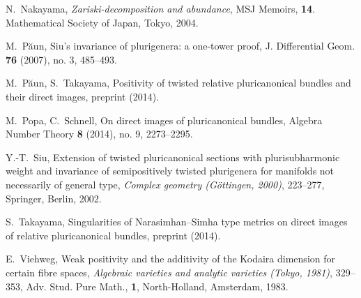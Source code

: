 \documentclass[12pt,twoside]{amsart}
\theoremstyle{definition}
\begin{document}
\begin{thebibliography}{BCHM}
N.~Nakayama, {\em{Zariski-decomposition and abundance}}, 
MSJ Memoirs, {\textbf{14}}. Mathematical Society of Japan, Tokyo, 2004. 

M.~P\u aun, 
Siu's invariance of plurigenera: a one-tower proof, 
J. Differential Geom. {\textbf{76}} (2007), no. 3, 485--493.

M.~P\u aun, S.~Takayama, 
Positivity of twisted relative 
pluricanonical bundles and their direct images, preprint (2014).  

M.~Popa, C.~Schnell, 
On direct images of pluricanonical bundles, 
Algebra Number Theory {\textbf{8}} (2014), no. 9, 2273--2295. 

Y.-T.~Siu, 
Extension of twisted pluricanonical 
sections with plurisubharmonic weight and 
invariance 
of semipositively twisted plurigenera for manifolds 
not necessarily of general type, 
{\em{Complex geometry (G\"ottingen, 2000)}}, 
223--277, Springer, Berlin, 2002. 

S.~Takayama, Singularities of Narasimhan--Simha type metrics on direct images 
of relative pluricanonical bundles, preprint (2014). 

E.~Viehweg, 
Weak positivity and the additivity of the Kodaira dimension for certain fibre spaces, 
{\em{Algebraic varieties and analytic varieties (Tokyo, 1981)}}, 329--353, 
Adv. Stud. Pure Math., {\textbf{1}}, North-Holland, Amsterdam, 1983. 
\end{thebibliography}
\end{document}
